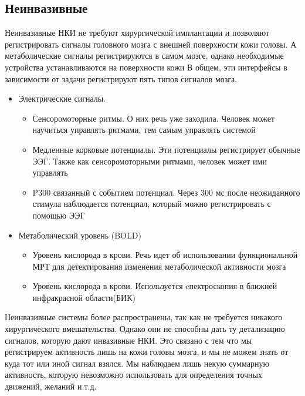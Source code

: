 \subsection*{Неинвазивные}
Неинвазивные НКИ не требуют хирургической имплантации и позволяют регистрировать сигналы головного мозга с внешней поверхности кожи головы. А метаболические сигналы регистрируются в самом мозге, однако необходимые устройства устанавливаются на поверхности кожи В общем, эти интерфейсы в зависимости от задачи регистрируют пять типов сигналов мозга. 
\begin{itemize}
	\item Электрические сигналы.
	\begin{itemize}	
		\item Сенсоромоторные ритмы. О них речь уже заходила. Человек может научиться управлять ритмами, тем самым управлять системой
		\item Медленные корковые потенциалы. Эти потенциалы регистрирует обычные ЭЭГ. Также как сенсоромоторными ритмами, человек может ими управлять
		\item P300 связанный с событием потенциал.  Через 300 мс после неожиданного стимула наблюдается потенциал, который можно регистрировать с помощью ЭЭГ
	\end{itemize}
	\item Метаболический уровень (BOLD)
	\begin{itemize}	
	\item Уровень кислорода в крови. Речь идет об использовании функциональной МРТ для детектирования изменения метаболической активности мозга
	\item Уровень кислорода в крови. Используется cпектроскопия в ближней инфракрасной области(БИК)
	\end{itemize}
\end{itemize} 

Неинвазивные системы более распространены, так как не требуется никакого хирургического вмешательства. Однако они не способны дать ту детализацию сигналов, которую дают инвазивные НКИ. Это связано с тем что мы регистрируем активность лишь на кожи головы мозга, и мы не можем знать от куда тот или иной сигнал взялся. Мы наблюдаем лишь некую суммарную активность, которую невозможно использовать для определения точных движений, желаний и.т.д.

